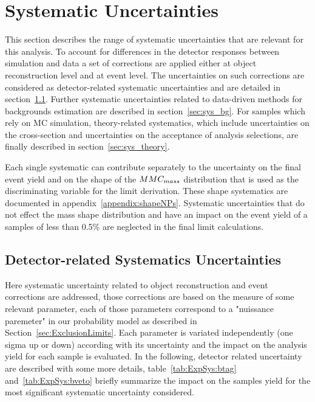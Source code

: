 \section{Systematic Uncertainties}
\label{sec:Systematics}

This section describes the range of systematic uncertainties
that are relevant for this analysis. To account for differences in the detector responses between simulation and data a 
set of corrections are applied either at object reconstruction level and at event level. 
The uncertainties on such corrections are considered as detector-related systematic 
uncertainties and are detailed in section~\ref{sec:sys:sys_det}. 
Further systematic uncertainties related to data-driven methods for backgrounds estimation
are described in section~\ref{sec:sys_bg}.  For
samples which rely on MC simulation, theory-related
systematics, which include uncertainties on the cross-section and
uncertainties on the acceptance of analysis selections,  
are finally described in section~\ref{sec:sys_theory}.

Each single systematic can contribute separately to the uncertainty on the
final event yield and on the shape of the $MMC_{mass}$
distribution that is used as the discriminating variable for the limit derivation. These shape systematics are
documented in appendix~\ref{appendix:shapeNPs}. Systematic uncertainties that do not effect the
mass shape distribution and have an impact on the event yield of a samples of less than 0.5\% are 
neglected in the final limit calculations.


\subsection{Detector-related Systematics Uncertainties}
\label{sec:sys:sys_det}
Here systematic uncertainty related to object reconstruction and event 
corrections are addressed, those corrections are based on the measure of some relevant parameter, 
each of those parameters correspond to a "nuissance paremeter" in our probability model 
as described in Section~\ref{sec:ExclusionLimits}.
Each parameter is variated independently (one sigma up or down) according with its 
uncertainty and the impact on the analysis yield for each sample is evaluated.
In the following, detector related uncertainty are  described with some more details,
table~\ref{tab:ExpSys:btag} and~\ref{tab:ExpSys:bveto} briefly summarize the impact on the samples 
yield for the most significant systematic uncertainty considered. 


